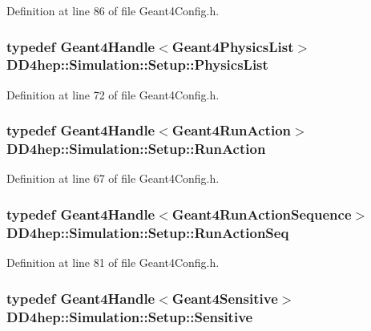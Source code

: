 Definition at line 86 of file Geant4Config.h.\hypertarget{namespace_d_d4hep_1_1_simulation_1_1_setup_a40c6d28ab3022c7744f6a1f28f38bd72}{
\subsubsection[{PhysicsList}]{\setlength{\rightskip}{0pt plus 5cm}typedef {\bf Geant4Handle}$<${\bf Geant4PhysicsList}$>$ {\bf DD4hep::Simulation::Setup::PhysicsList}}}
\label{namespace_d_d4hep_1_1_simulation_1_1_setup_a40c6d28ab3022c7744f6a1f28f38bd72}


Definition at line 72 of file Geant4Config.h.\hypertarget{namespace_d_d4hep_1_1_simulation_1_1_setup_a9a6172ddf65752b351495ec3d99c6379}{
\subsubsection[{RunAction}]{\setlength{\rightskip}{0pt plus 5cm}typedef {\bf Geant4Handle}$<${\bf Geant4RunAction}$>$ {\bf DD4hep::Simulation::Setup::RunAction}}}
\label{namespace_d_d4hep_1_1_simulation_1_1_setup_a9a6172ddf65752b351495ec3d99c6379}


Definition at line 67 of file Geant4Config.h.\hypertarget{namespace_d_d4hep_1_1_simulation_1_1_setup_ab53cac92250bbb067944b1393760ec72}{
\subsubsection[{RunActionSeq}]{\setlength{\rightskip}{0pt plus 5cm}typedef {\bf Geant4Handle}$<${\bf Geant4RunActionSequence}$>$ {\bf DD4hep::Simulation::Setup::RunActionSeq}}}
\label{namespace_d_d4hep_1_1_simulation_1_1_setup_ab53cac92250bbb067944b1393760ec72}


Definition at line 81 of file Geant4Config.h.\hypertarget{namespace_d_d4hep_1_1_simulation_1_1_setup_ac10ac91464a827e81aaf5e8aa77ca56c}{
\subsubsection[{Sensitive}]{\setlength{\rightskip}{0pt plus 5cm}typedef {\bf Geant4Handle}$<${\bf Geant4Sensitive}$>$ {\bf DD4hep::Simulation::Setup::Sensitive}}}
\label{namespace_d_d4hep_1_1_simulation_1_1_setup_ac10ac91464a827e81aaf5e8aa77ca56c}


